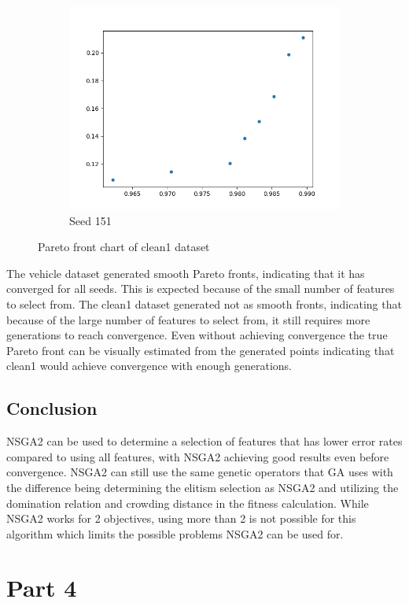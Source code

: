\documentclass{article}
\begin{document}
\begin{figure}[h!]
\begin{subfigure}[b]{0.3\linewidth}
		\includegraphics[width=\linewidth]{clean1_151.png}
		\caption{Seed 151}
	\end{subfigure}
	\caption{Pareto front chart of clean1 dataset}
\end{figure}
The vehicle dataset generated smooth Pareto fronts, indicating that it has converged for all seeds. This is expected because of the small number of features to select from. The clean1 dataset generated not as smooth fronts, indicating that because of the large number of features to select from, it still requires more generations to reach convergence. Even without achieving convergence the true Pareto front can be visually estimated from the generated points indicating that clean1 would achieve convergence with enough generations.
\subsection*{Conclusion}
NSGA2 can be used to determine a selection of features that has lower error rates compared to using all features, with NSGA2 achieving good results even before convergence. NSGA2 can still use the same genetic operators that GA uses with the difference being determining the elitism selection as NSGA2 and utilizing the domination relation and crowding distance in the fitness calculation. While NSGA2 works for 2 objectives, using more than 2 is not possible for this algorithm which limits the possible problems NSGA2 can be used for. 
\section*{Part 4}
\end{document}
